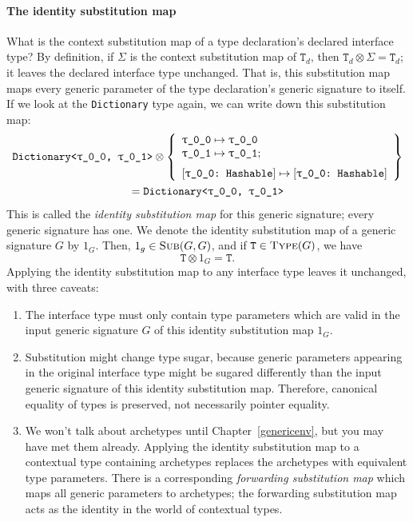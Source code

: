 \documentclass[../generics]{subfiles}
\begin{document}
\paragraph{The identity substitution map}
What is the context substitution map of a type declaration's declared interface type? By definition, if $\Sigma$ is the context substitution map of $\texttt{T}_d$, then $\texttt{T}_d\otimes\Sigma=\texttt{T}_d$; it leaves the declared interface type unchanged. That is, this substitution map maps every generic parameter of the type declaration's generic signature to itself. If we look at the \texttt{Dictionary} type again, we can write down this substitution map:
\begin{multline*}
\texttt{Dictionary<\ttgp{0}{0}, \ttgp{0}{1}>}\otimes
\SubstMapLongC{
\SubstType{\ttgp{0}{0}}{\ttgp{0}{0}}\\
\SubstType{\ttgp{0}{1}}{\ttgp{0}{1}}
}{
\SubstConf{\ttgp{0}{0}}{\ttgp{0}{0}}{Hashable}
}\\
= \texttt{Dictionary<\ttgp{0}{0}, \ttgp{0}{1}>}
\end{multline*}
This is called the \emph{identity substitution map} for this generic signature; every generic signature has one. We denote the identity substitution map of a generic signature $G$ by $1_G$. Then, $1_g\in\textsc{Sub}({G, G})$, and if $\texttt{T}\in\textsc{Type}({G})$, we have
\[\texttt{T} \otimes 1_G = \texttt{T}.\]
Applying the identity substitution map to any interface type leaves it unchanged, with three caveats:
\begin{enumerate}
\item The interface type must only contain type parameters which are valid in the input generic signature $G$ of this identity substitution map $1_G$.
\item Substitution might change type sugar, because generic parameters appearing in the original interface type might be sugared differently than the input generic signature of this identity substitution map. Therefore, canonical equality of types is preserved, not necessarily pointer equality.
\item We won't talk about archetypes until Chapter~\ref{genericenv}, but you may have met them already. Applying the identity substitution map to a contextual type containing archetypes replaces the archetypes with equivalent type parameters. There is a corresponding \emph{forwarding substitution map} which maps all generic parameters to archetypes; the forwarding substitution map acts as the identity in the world of contextual types.
\end{enumerate}
\end{document}
